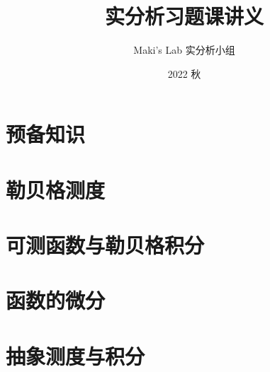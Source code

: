 \documentclass[lang=cn, color=none]{elegantbook}
\title{实分析习题课讲义}
\subtitle{}
\author{Maki's Lab 实分析小组}
\institute{Maki's Lab}
\date{2022 秋}
\begin{document}

\maketitle
\frontmatter

\tableofcontents

\mainmatter
\chapter{预备知识}
    
    
    
    
\chapter{勒贝格测度}
    
    
    
    
\chapter{可测函数与勒贝格积分}
    

    
    
    
    
    

    

\chapter{函数的微分}
    
    

\chapter{抽象测度与积分}
    
    

\end{document}
